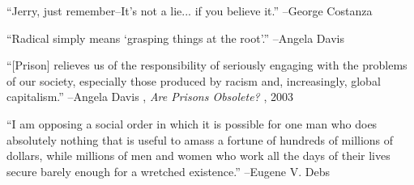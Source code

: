 \documentclass{article}%
\begin{document}
\linebreak%
\vspace{1mm}%
\begin{minipage}{\textwidth}%
\flushleft%
“Jerry, just remember–It's not a lie... if you believe it.”%
\linebreak%
\vspace{1mm}%
–George Costanza%
\linebreak%
\vspace{1mm}%
\end{minipage}%
\linebreak%
\vspace{1mm}%
\begin{minipage}{\textwidth}%
\flushleft%
“Radical simply means ‘grasping things at the root’.”%
\linebreak%
\vspace{1mm}%
–Angela Davis%
\linebreak%
\vspace{1mm}%
\end{minipage}%
\linebreak%
\vspace{1mm}%
\begin{minipage}{\textwidth}%
\flushleft%
“{[}Prison{]} relieves us of the responsibility of seriously engaging with the problems of  our society, especially those produced by racism and, increasingly, global capitalism.”%
\linebreak%
\vspace{1mm}%
–Angela Davis%
, \textit{Are Prisons Obsolete?}%
, 2003%
\linebreak%
\vspace{1mm}%
\end{minipage}%
\linebreak%
\vspace{1mm}%
\begin{minipage}{\textwidth}%
\flushleft%
“I am opposing a social order in which it is possible for one man who does absolutely nothing that is useful to amass a fortune of hundreds of millions of dollars, while millions of men and women who work all the days of their lives secure barely enough for a wretched existence.”%
\linebreak%
\vspace{1mm}%
–Eugene V. Debs%
\linebreak%
\vspace{1mm}%
\end{minipage}%
\linebreak%
\vspace{1mm}%
\end{document}
